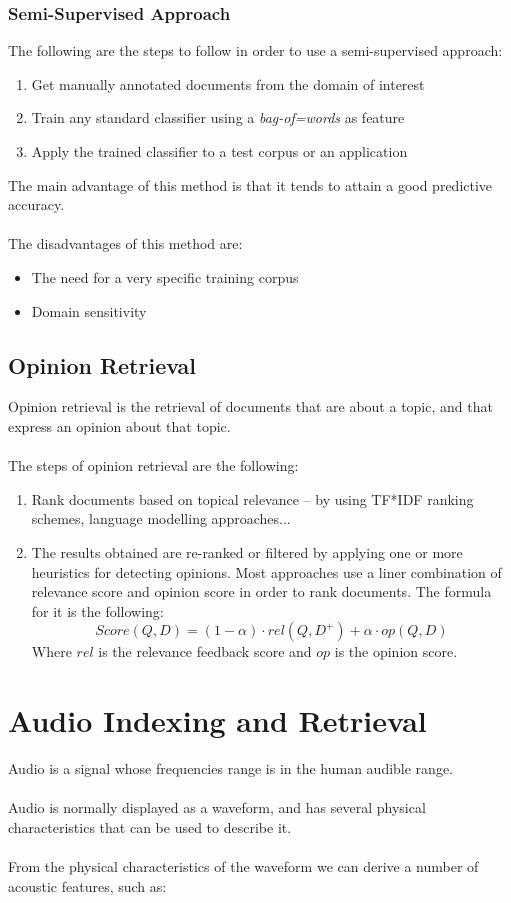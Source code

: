\documentclass{article}
\begin{document}
\subsubsection{Semi-Supervised Approach}
The following are the steps to follow in order to use a semi-supervised approach:

\begin{enumerate}
	\item Get manually annotated documents from the domain of interest
	\item Train any standard classifier using a \textit{bag-of=words} as feature
	\item Apply the trained classifier to a test corpus or an application
\end{enumerate}
The main advantage of this method is that it tends to attain a good predictive accuracy. \\ \\
The disadvantages of this method are:

\begin{itemize}
	\item The need for a very specific training corpus
	\item Domain sensitivity
\end{itemize}

\subsection{Opinion Retrieval}
Opinion retrieval is the retrieval of documents that are about a topic, and that express an opinion about that topic. \\ \\
The steps of opinion retrieval are the following:

\begin{enumerate}
	\item Rank documents based on topical relevance -- by using TF*IDF ranking schemes, language modelling approaches...
	\item The results obtained are re-ranked or filtered by applying one or more heuristics for detecting opinions. Most approaches use a liner combination of relevance score and opinion score in order to rank documents. The formula for it is the following:
	\[ Score(Q,D) = (1 - \alpha) \cdot rel(Q,D^{+}) + \alpha \cdot op(Q,D) \]
	Where $rel$ is the relevance feedback score and $op$ is the opinion score.
\end{enumerate}

\section{Audio Indexing and Retrieval}
Audio is a signal whose frequencies range is in the human audible range. \\ \\
Audio is normally displayed as a waveform, and has several physical characteristics that can be used to describe it. \\ \\
From the physical characteristics of the waveform we can derive a number of acoustic features, such as:
\end{document}
